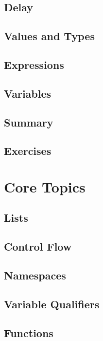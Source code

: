 \documentclass[oneside]{book}
\begin{document}
\section{Delay}
\blindtext

\section{Values and Types}
\blindtext

\section{Expressions}
\blindtext

\section{Variables}
\blindtext

\section{Summary}
\blindtext

\section{Exercises}
\blindtext

\chapter{Core Topics}
\blindtext

\section{Lists}

\section{Control Flow}
\blindtext

\section{Namespaces}
\blindtext

\section{Variable Qualifiers}
\blindtext

\section{Functions}
\blindtext
\end{document}

